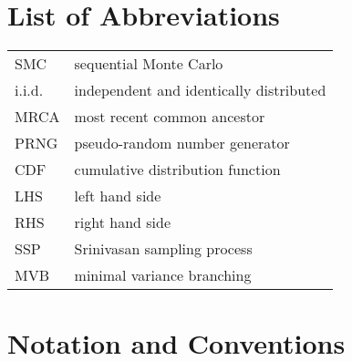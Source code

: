 \documentclass[oneside]{scrbook} %
\theoremstyle{definition}
\newcommand{\1}[1]{\mathbbm{1}_{#1}} %
\begin{document}
\chapter{List of Abbreviations}
\begin{tabular}{p{} p{}}
SMC & sequential Monte Carlo \\
i.i.d. & independent and identically distributed \\
MRCA & most recent common ancestor \\
PRNG & pseudo-random number generator \\
CDF & cumulative distribution function \\
LHS & left hand side \\
RHS & right hand side \\
SSP & Srinivasan sampling process \\
MVB & minimal variance branching \\
\end{tabular}


\chapter{Notation and Conventions}
\end{document}

